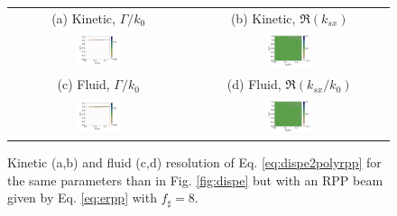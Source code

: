 \documentclass[
 reprint,
 amsmath,amssymb,
 aps,
]{revtex4-1}
\begin{document}
 \begin{figure}
\begin{tabular}{cc}
(a) Kinetic, $\Gamma/k_0$ &
(b)  Kinetic, $\Re(k_{sx})$ \\
\includegraphics[width=0.25\textwidth]{Grpp_Hp.png}&
\includegraphics[width=0.25\textwidth]{krpp_Hp.png}\\
(c) Fluid, $\Gamma/k_0$  &
(d) Fluid, $\Re(k_{sx}/k_0)$  \\
\includegraphics[width=0.25\textwidth]{Gfrpp_Hp.png}&
\includegraphics[width=0.25\textwidth]{kfrpp_Hp.png}
\end{tabular}
\caption{ \label{fig:disperpp}  
Kinetic (a,b) and fluid (c,d) resolution of Eq. \eqref{eq:dispe2polyrpp} for  the same parameters than in Fig. \ref{fig:dispe} but with an RPP beam given by Eq. \eqref{eq:erpp} with $f_\sharp=8$. 
 }
\end{figure}
\end{document}
